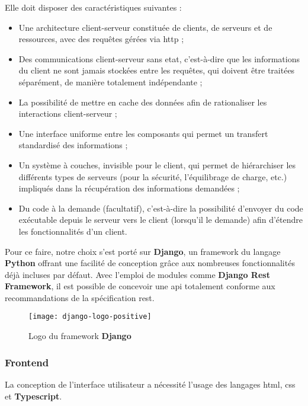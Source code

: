 Elle doit disposer des caractéristiques suivantes :

\begin{itemize}
  \item Une architecture client-serveur constituée de clients, de serveurs et de ressources, avec des requêtes gérées via \acrshort{http} ;
  \item Des communications client-serveur sans etat, c'est-à-dire que les informations du client ne sont jamais stockées entre les requêtes, 
  qui doivent être traitées séparément, de manière totalement indépendante ;
  \item La possibilité de mettre en cache des données afin de rationaliser les interactions client-serveur ;
  \item Une interface uniforme entre les composants qui permet un transfert standardisé des informations ;
  \item Un système à couches, invisible pour le client, qui permet de hiérarchiser les différents types de serveurs 
  (pour la sécurité, l'équilibrage de charge, etc.) impliqués dans la récupération des informations demandées ;
  \item Du code à la demande (facultatif), c'est-à-dire la possibilité d'envoyer du code exécutable depuis le serveur vers le client 
  (lorsqu'il le demande) afin d'étendre les fonctionnalités d'un client.\cite{redhat_rest_spec}
\end{itemize}

Pour ce faire, notre choix s’est porté sur \textbf{Django}, un framework du langage \textbf{Python} offrant une facilité de conception grâce aux nombreuses fonctionnalités déjà incluses par défaut. 
Avec l’emploi de modules comme \textbf{Django Rest Framework}, il est possible de concevoir une \acrshort{api} totalement conforme aux recommandations de la spécification \acrshort{rest}.

\begin{figure}[H]
  \centering
  \texttt{[image: django-logo-positive]}
  \caption{Logo du framework \textbf{Django}}
  \label{fig:django_logo}
\end{figure}


\subsubsection{Frontend}
La conception de l’interface utilisateur a nécessité l’usage des langages \acrshort{html}, \acrshort{css} et \textbf{Typescript}.

